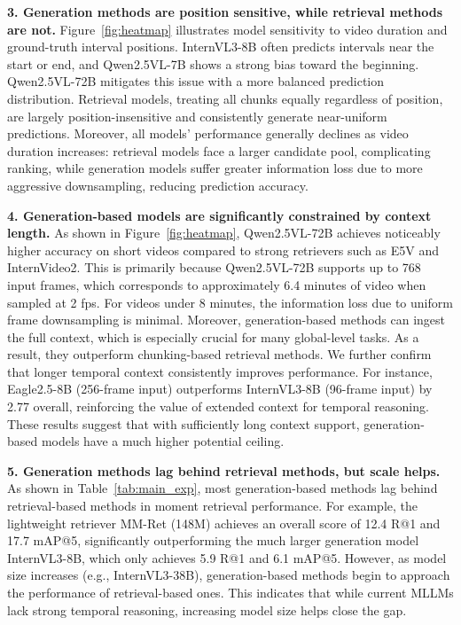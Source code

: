 \documentclass{article}
\begin{document}
\textbf{3. Generation methods are position sensitive, while retrieval methods are not.}
Figure~\ref{fig:heatmap} illustrates model sensitivity to video duration and ground-truth interval positions. InternVL3-8B often predicts intervals near the start or end, and Qwen2.5VL-7B shows a strong bias toward the beginning. Qwen2.5VL-72B mitigates this issue with a more balanced prediction distribution. Retrieval models, treating all chunks equally regardless of position, are largely position-insensitive and consistently generate near-uniform predictions. Moreover, all models' performance generally declines as video duration increases: retrieval models face a larger candidate pool, complicating ranking, while generation models suffer greater information loss due to more aggressive downsampling, reducing prediction accuracy.

\textbf{4. Generation-based models are significantly constrained by context length.}
As shown in Figure~\ref{fig:heatmap}, Qwen2.5VL-72B achieves noticeably higher accuracy on short videos compared to strong retrievers such as E5V and InternVideo2. This is primarily because Qwen2.5VL-72B supports up to 768 input frames, which corresponds to approximately 6.4 minutes of video when sampled at 2 fps. For videos under 8 minutes, the information loss due to uniform frame downsampling is minimal. Moreover, generation-based methods can ingest the full context, which is especially crucial for many global-level tasks. As a result, they outperform chunking-based retrieval methods. We further confirm that longer temporal context consistently improves performance. For instance, Eagle2.5-8B (256-frame input) outperforms InternVL3-8B (96-frame input) by 2.77 overall, reinforcing the value of extended context for temporal reasoning. These results suggest that with sufficiently long context support, generation-based models have a much higher potential ceiling.


\textbf{5. Generation methods lag behind retrieval methods, but scale helps.}
As shown in Table~\ref{tab:main_exp}, most generation-based methods lag behind retrieval-based methods in moment retrieval performance. For example, the lightweight retriever MM-Ret (148M) achieves an overall score of 12.4 R@1 and 17.7 mAP@5, significantly outperforming the much larger generation model InternVL3-8B, which only achieves 5.9 R@1 and 6.1 mAP@5. However, as model size increases (e.g., InternVL3-38B), generation-based methods begin to approach the performance of retrieval-based ones. This indicates that while current MLLMs lack strong temporal reasoning, increasing model size helps close the gap.
\end{document}
